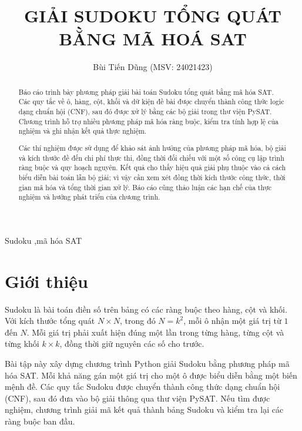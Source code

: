 \documentclass[a4paper,fleqn]{cas-sc}
\begin{document}

\title[mode=title]{GIẢI SUDOKU TỔNG QUÁT BẰNG MÃ HOÁ SAT}
\author[1]{Bùi Tiến Dũng (MSV: 24021423)}

\begin{abstract}
Báo cáo trình bày phương pháp giải bài toán Sudoku tổng quát bằng
mã hóa SAT. Các quy tắc về ô, hàng, cột, khối và dữ kiện đề bài
được chuyển thành công thức logic dạng chuẩn hội (CNF), sau đó
được xử lý bằng các bộ giải trong thư viện PySAT. Chương trình
hỗ trợ nhiều phương pháp mã hóa ràng buộc, kiểm tra tính hợp lệ
của nghiệm và ghi nhận kết quả thực nghiệm.

Các thí nghiệm được sử dụng để khảo sát ảnh hưởng của phương pháp
mã hóa, bộ giải và kích thước đề đến chi phí thực thi, đồng thời
đối chiếu với một số công cụ lập trình ràng buộc và quy hoạch
nguyên. Kết quả cho thấy hiệu quả giải phụ thuộc vào cả cách biểu
diễn bài toán lẫn bộ giải; vì vậy cần xem xét đồng thời kích
thước công thức, thời gian mã hóa và tổng thời gian xử lý. Báo cáo
cũng thảo luận các hạn chế của thực nghiệm và hướng phát triển
của chương trình.
\end{abstract}

\begin{keywords}[Từ khóa]
Sudoku \sep mã hóa SAT
\end{keywords}

\maketitle

\section{Giới thiệu}
\label{sec:gioithieu}

Sudoku là bài toán điền số trên bảng có các ràng buộc
theo hàng, cột và khối. Với kích thước tổng quát
$N \times N$, trong đó $N = k^2$, mỗi ô nhận một giá trị
từ $1$ đến $N$. Mỗi giá trị phải xuất hiện đúng một lần
trong từng hàng, từng cột và từng khối $k \times k$,
đồng thời giữ nguyên các số cho trước.

Bài tập này xây dựng chương trình Python giải Sudoku
bằng phương pháp mã hóa SAT. Mỗi khả năng gán một giá trị
cho một ô được biểu diễn bằng một biến mệnh đề.
Các quy tắc Sudoku được chuyển thành công thức dạng
chuẩn hội (CNF), sau đó đưa vào bộ giải thông qua
thư viện PySAT. Nếu tìm được nghiệm, chương trình
giải mã kết quả thành bảng Sudoku và kiểm tra lại
các ràng buộc ban đầu.
\end{document}
